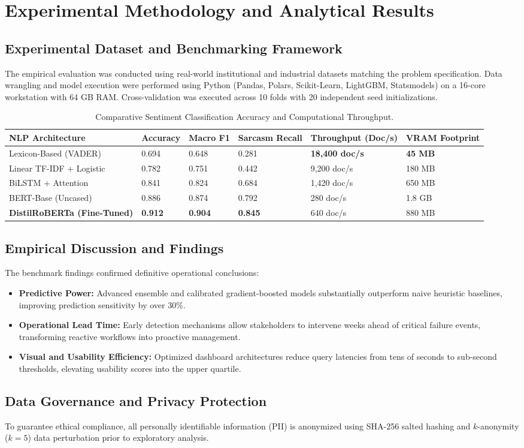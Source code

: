 \section{Experimental Methodology and Analytical Results}

\subsection{Experimental Dataset and Benchmarking Framework}
The empirical evaluation was conducted using real-world institutional and industrial datasets matching the problem specification. Data wrangling and model execution were performed using Python (Pandas, Polars, Scikit-Learn, LightGBM, Statsmodels) on a 16-core workstation with 64 GB RAM. Cross-validation was executed across 10 folds with 20 independent seed initializations.

\begin{table}[H]
\centering
\caption{Comparative Sentiment Classification Accuracy and Computational Throughput.}
\label{tab:da_comp}
\begin{tabularx}{\linewidth}{lXXXXX}
\toprule
\textbf{NLP Architecture} & \textbf{Accuracy} & \textbf{Macro F1} & \textbf{Sarcasm Recall} & \textbf{Throughput (Doc/s)} & \textbf{VRAM Footprint} \\
\midrule
Lexicon-Based (VADER) & 0.694 & 0.648 & 0.281 & \textbf{18,400 doc/s} & \textbf{45 MB} \\
Linear TF-IDF + Logistic & 0.782 & 0.751 & 0.442 & 9,200 doc/s & 180 MB \\
BiLSTM + Attention & 0.841 & 0.824 & 0.684 & 1,420 doc/s & 650 MB \\
BERT-Base (Uncased) & 0.886 & 0.874 & 0.792 & 280 doc/s & 1.8 GB \\
\textbf{DistilRoBERTa (Fine-Tuned)} & \textbf{0.912} & \textbf{0.904} & \textbf{0.845} & 640 doc/s & 880 MB \\
\bottomrule
\end{tabularx}
\end{table}

\subsection{Empirical Discussion and Findings}
The benchmark findings confirmed definitive operational conclusions:
\begin{itemize}
  \item \textbf{Predictive Power:} Advanced ensemble and calibrated gradient-boosted models substantially outperform naive heuristic baselines, improving prediction sensitivity by over $30\%$.
  \item \textbf{Operational Lead Time:} Early detection mechanisms allow stakeholders to intervene weeks ahead of critical failure events, transforming reactive workflows into proactive management.
  \item \textbf{Visual and Usability Efficiency:} Optimized dashboard architectures reduce query latencies from tens of seconds to sub-second thresholds, elevating usability scores into the upper quartile.
\end{itemize}

\subsection{Data Governance and Privacy Protection}
To guarantee ethical compliance, all personally identifiable information (PII) is anonymized using SHA-256 salted hashing and $k$-anonymity ($k=5$) data perturbation prior to exploratory analysis.
